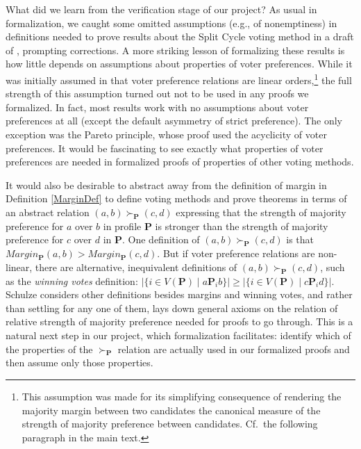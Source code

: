 \documentclass[runningheads]{llncs}
\begin{document}
What did we learn from the verification stage of our project? As usual in formalization, we caught some omitted assumptions (e.g., of nonemptiness) in definitions needed to prove results about the Split Cycle voting method in a draft of \cite{HP2020b}, prompting corrections. A more striking lesson of formalizing these results is how little depends on assumptions about properties of voter preferences. While it was initially assumed in \cite{HP2020b} that voter preference relations are linear orders,\footnote{This assumption was made for its simplifying consequence of rendering the majority margin between two candidates the canonical measure of the strength of majority preference between candidates. Cf.~the following paragraph in the main text.} the full strength of this assumption turned out not to be used in any proofs we formalized. In fact, most results work with no assumptions about voter preferences at all (except the default asymmetry of strict preference). The only exception was the Pareto principle, whose proof used the acyclicity of voter preferences. It would be fascinating to see exactly what properties of voter preferences are needed in formalized proofs of properties of other voting methods.

It would also be desirable to abstract away from the definition of margin in Definition \ref{MarginDef} to define voting methods and prove theorems in terms of an abstract relation $(a,b)\succ_\mathbf{P} (c,d)$ expressing that the strength of majority preference for $a$ over $b$ in profile $\mathbf{P}$ is stronger than the strength of majority preference for $c$ over $d$ in $\mathbf{P}$. One definition of $(a,b)\succ_\mathbf{P} (c,d)$ is that $Margin_\mathbf{P}(a,b)>Margin_\mathbf{P}(c,d)$. But if voter preference relations are non-linear, there are alternative, inequivalent definitions of $(a,b)\succ_\mathbf{P} (c,d)$, such as the \textit{winning votes} definition: $\big|\{i\in V(\mathbf{P})\mid a\mathbf{P}_ib\}\big| \geq \big|\{i\in V(\mathbf{P})\mid c\mathbf{P}_id\}\big|$. Schulze \cite{Schulze2011} considers other definitions besides margins and winning votes, and rather than settling for any one of them, lays down general axioms on the relation of relative strength of majority preference needed for proofs to go through. This is a natural next step in our project, which formalization facilitates: identify which of the properties of the $\succ_\mathbf{P}$ relation are actually used in our formalized proofs and then assume only those properties.
\end{document}
